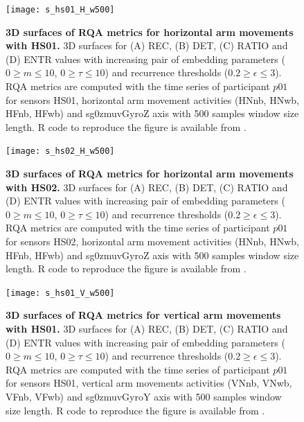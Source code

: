 \begin{figure}[!ht]
\centering
\texttt{[image: s\_hs01\_H\_w500]}
    \caption{
	{\bf 3D surfaces of RQA metrics for horizontal arm movements with HS01.}
	3D surfaces for (A) REC, (B) DET, (C) RATIO and (D) ENTR values 
	with increasing pair of embedding parameters 
	($0 \ge m \le 10$, $0 \ge \tau \le 10$) 
	and recurrence thresholds ($ 0.2 \ge \epsilon \le 3 $).
	RQA metrics are computed with the time series of participant $p01$ 
	for sensors HS01, horizontal arm movement activities 
	(HNnb, HNwb, HFnb, HFwb) and 
	sg0zmuvGyroZ axis with 500 samples window size length. 
        R code to reproduce the figure is available from \cite{hwum2018}.
	}
\label{fig:topo_s_hs01_H_w500}
\end{figure}

\begin{figure}[!ht]
\centering
\texttt{[image: s\_hs02\_H\_w500]}
    \caption{
	{\bf 3D surfaces of RQA metrics for horizontal arm movements with HS02.}
	3D surfaces for (A) REC, (B) DET, (C) RATIO and (D) ENTR values 
	with increasing pair of embedding parameters 
	($0 \ge m \le 10$, $0 \ge \tau \le 10$) 
	and recurrence thresholds ($ 0.2 \ge \epsilon \le 3 $).
	RQA metrics are computed with the time series of participant $p01$ 
	for sensors HS02, horizontal arm movement activities 
	(HNnb, HNwb, HFnb, HFwb) and 
	sg0zmuvGyroZ axis with 500 samples window size length. 
        R code to reproduce the figure is available from \cite{hwum2018}.
	}
\label{fig:topo_s_hs02_H_w500}
\end{figure}

\begin{figure}[!ht]
\centering
\texttt{[image: s\_hs01\_V\_w500]}
    \caption{
	{\bf 3D surfaces of RQA metrics for vertical arm movements with HS01.}
	3D surfaces for (A) REC, (B) DET, (C) RATIO and (D) ENTR values 
	with increasing pair of embedding parameters 
	($0 \ge m \le 10$, $0 \ge \tau \le 10$) 
	and recurrence thresholds ($ 0.2 \ge \epsilon \le 3 $).
	RQA metrics are computed with the time series of participant $p01$ 
	for sensors HS01, vertical arm movements activities 
	(VNnb, VNwb, VFnb, VFwb) and 
	sg0zmuvGyroY axis with 500 samples window size length. 
        R code to reproduce the figure is available from \cite{hwum2018}.
	}
\label{fig:topo_s_hs01_V_w500}
\end{figure}


